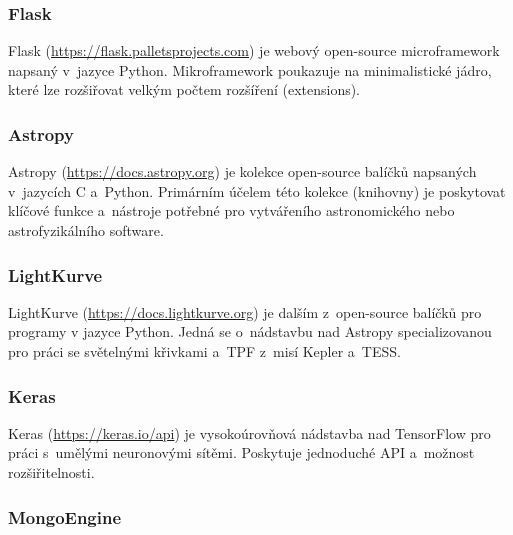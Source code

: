 \documentclass[a4paper,12pt]{article}
\begin{document}
{{{{{{{{\subsubsection{Flask}

Flask (\url{https://flask.palletsprojects.com}) je webový open-source microframework napsaný v~jazyce Python. Mikroframework poukazuje na minimalistické jádro, které lze rozšiřovat velkým počtem rozšíření (extensions).



\subsubsection{Astropy}

Astropy (\url{https://docs.astropy.org}) je kolekce open-source balíčků napsaných v~jazycích C a~Python. Primárním účelem této kolekce (knihovny) je poskytovat klíčové funkce a~nástroje potřebné pro vytvářeního astronomického nebo astrofyzikálního software.



\subsubsection{LightKurve}

LightKurve (\url{https://docs.lightkurve.org}) je dalším z~open-source balíčků pro programy v jazyce Python. Jedná se o~nádstavbu nad Astropy specializovanou pro práci se světelnými křivkami a~TPF z~misí Kepler a~TESS.



\subsubsection{Keras}

Keras (\url{https://keras.io/api}) je vysokoúrovňová nádstavba nad TensorFlow pro práci s~umělými neuronovými sítěmi. Poskytuje jednoduché API a~možnost rozšiřitelnosti.



\subsubsection{MongoEngine}

}}}}}}}}
\end{document}
